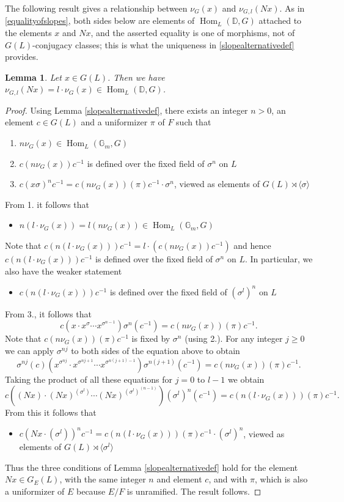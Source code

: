 \documentclass[11pt,a4paper]{article}
\theoremstyle{definition}
\theoremstyle{plain}
\newtheorem{Le}[shared]{Lemma}
\theoremstyle{remark}
\theoremstyle{plain}
\DeclareMathOperator{\Hom}{Hom}
\begin{document}
The following result gives a relationship between $\nu_G(x)$ and $\nu_{G,l}(Nx)$. As in \ref{equalityofslopes}, both sides below are elements of $\Hom_L(\mathbb{D},G)$ attached to the elements $x$ and $Nx$, and the asserted equality is one of morphisms, not of $G(L)$-conjugacy classes; this is what the uniqueness in \ref{slopealternativedef} provides.

\begin{Le}\label{normisolem1}
    Let $x \in G(L)$. Then we have $\nu_{G,l}(Nx) = l \cdot \nu_G (x) \in \Hom_L(\mathbb{D},G)$.
\end{Le}
\begin{proof}
    Using Lemma \ref{slopealternativedef}, there exists an integer $n > 0$, an element $c \in G(L)$ and a uniformizer $\pi$ of $F$ such that
    \begin{enumerate}
    \item $n\nu_G(x) \in \Hom_L(\mathbb{G}_m, G)$
    \item $c (n\nu_G(x)) c^{-1}$ is defined over the fixed field of $\sigma^n$ on $L$
    \item $c (x\sigma)^nc^{-1} = c (n\nu_G(x))(\pi)c^{-1} \cdot  \sigma^n$, viewed as elements of $G(L) \rtimes \langle \sigma \rangle $
\end{enumerate}
From 1. it follows that
\begin{itemize}
    \item $n (l \cdot \nu_G(x)) = l (n\nu_G(x)) \in \Hom_L(\mathbb{G}_m, G)$
\end{itemize}
Note that $c (n(l \cdot \nu_G(x))) c^{-1} = l \cdot (c(n\nu_G(x))c^{-1})$ and hence $c (n(l \cdot \nu_G(x))) c^{-1}$ is defined over the fixed field of $\sigma^n$ on $L$. In particular, we also have the weaker statement
\begin{itemize}
    \item $c (n(l \cdot \nu_G(x))) c^{-1}$ is defined over the fixed field of $(\sigma^l)^n$ on $L$
\end{itemize}
From 3., it follows that
$$c(x \cdot x^{\sigma} \cdots x^{\sigma^{n-1}})\sigma^n(c^{-1}) =  c (n\nu_G(x))(\pi)c^{-1}.$$
Note that $c (n\nu_G(x))(\pi)c^{-1}$ is fixed by $\sigma^n$ (using 2.). For any integer $j \geq 0$ we can apply $\sigma^{nj}$ to both sides of the equation above to obtain 
$$\sigma^{nj}(c)(x^{\sigma^{nj}} \cdot x^{\sigma^{nj+1}} \cdots x^{\sigma^{n(j+1)-1}})\sigma^{n(j+1)}(c^{-1}) =  c (n\nu_G(x))(\pi)c^{-1}.$$
Taking the product of all these equations for $j = 0$ to $l-1$ we obtain
$$ c((Nx) \cdot (Nx)^{(\sigma^l)} \cdots (Nx)^{(\sigma^l)^{(n-1)}}) (\sigma^l)^n(c^{-1}) =  c (n(l \cdot \nu_G(x)))(\pi)c^{-1}.$$
From this it follows that
\begin{itemize}
    \item $c (Nx \cdot (\sigma^l))^nc^{-1} = c (n(l\cdot \nu_G(x)))(\pi)c^{-1} \cdot  (\sigma^l)^n$, viewed as elements of $G(L) \rtimes \langle \sigma^l \rangle$
\end{itemize}
Thus the three conditions of Lemma \ref{slopealternativedef} hold for the element $Nx \in G_E(L)$, with the same integer $n$ and element $c$, and with $\pi$, which is also a uniformizer of $E$ because $E/F$ is unramified. The result follows.
\end{proof}
\end{document}
